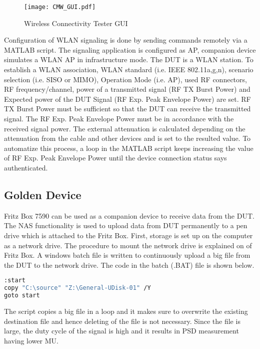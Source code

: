 \begin{figure}[H]
\centering
\texttt{[image: CMW\_GUI.pdf]}
\caption{Wireless Connectivity Tester \acs{GUI}}
\label{fig:cmwGUI}
\end{figure}

Configuration of \acs{WLAN} signaling is done by sending commands remotely via a MATLAB\textregistered{} script.  The signaling application is configured as \acf{AP}, companion device simulates a \acs{WLAN} \acf{AP} in infrastructure mode. The \acs{DUT} is a \acs{WLAN} station. To establish a \acs{WLAN} association, \acs{WLAN} standard (i.e. \acs{IEEE} 802.11a,g,n), scenario selection (i.e. \acs{SISO} or \acs{MIMO}), Operation Mode (i.e. \acs{AP}), used \acs{RF} connectors, \acs{RF} frequency/channel, power of a transmitted signal (\acs{RF} TX Burst Power) and Expected power of the \acs{DUT} Signal (\acs{RF} Exp. Peak Envelope Power) are set. \acs{RF} TX Burst Power must be sufficient so that the \acs{DUT} can receive the transmitted signal. The \acs{RF} Exp. Peak Envelope Power must be in accordance with the received signal power. The external attenuation is calculated depending on the attenuation from the cable and other devices and is set to the resulted value. To automatize this process, a loop in the MATLAB\textregistered{} script keeps increasing the value of \acs{RF} Exp. Peak Envelope Power until the device connection status says authenticated.

\subsection{Golden Device} \label{sec:golden}

Fritz Box 7590 can be used as a companion device to receive data from the \acs{DUT}. The \acf{NAS} functionality is used to upload data from \acs{DUT} permanently to a pen drive which is attached to the Fritz Box. First, storage is set up on the computer as a network drive. The procedure to mount the network drive is explained on \cite{fritz} of Fritz Box. A windows batch file is written to continuously upload a big file from the \acs{DUT} to the network drive. The code in the batch (.BAT) file is shown below.

\begin{lstlisting}[language=bash]
:start
copy "C:\source" "Z:\General-UDisk-01" /Y
goto start
\end{lstlisting}

The script copies a big file in a loop and it makes sure to overwrite the existing destination file and hence deleting of the file is not necessary. Since the file is large, the duty cycle of the signal is high and it results in \ac{PSD} measurement having lower \acf{MU}. 

